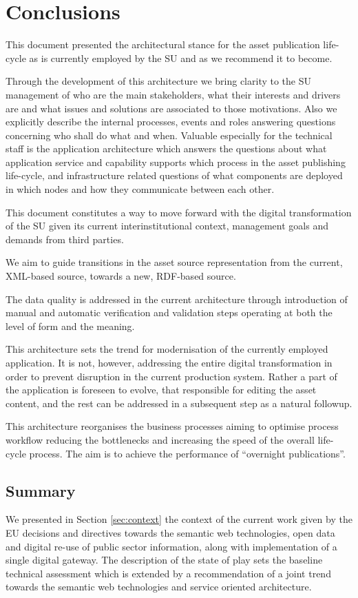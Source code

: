 \section{Conclusions}
\label{sec:conclusions}
	
	This document presented the architectural stance for the asset publication life-cycle as is currently employed by the SU and as we recommend it to become.
	
	Through the development of this architecture we bring clarity to the SU management of who are the main stakeholders, what their interests and drivers are and what issues and solutions are associated to those motivations. Also we explicitly describe the internal processes, events and roles answering questions concerning who shall do what and when. Valuable especially for the technical staff is the application architecture which answers the questions about what application service and capability supports which process in the asset publishing life-cycle, and infrastructure related questions of what components are deployed in which nodes and how they communicate between each other. 
	
	This document constitutes a way to move forward with the digital transformation of the SU given its current interinstitutional context, management goals and demands from third parties.
	
	We aim to guide transitions in the asset source representation from the current, XML-based source, towards a new, RDF-based source. 
	
    The data quality is addressed in the current architecture through introduction of manual and automatic verification and validation steps operating at both the level of form and the meaning.
    
    This architecture sets the trend for modernisation of the currently employed application. It is not, however, addressing the entire digital transformation in order to prevent disruption in the current production system. Rather a part of the application is foreseen to evolve, that responsible for editing the asset content, and the rest can be addressed in a subsequent step as a natural followup.
	
	This architecture reorganises the business processes aiming to optimise process workflow reducing the bottlenecks and increasing the speed of the overall life-cycle process. The aim is to achieve the performance of ``overnight publications''. 

	\subsection{Summary}
	We presented in Section \ref{sec:context} the context of the current work given by the EU decisions and directives towards the semantic web technologies, open data and digital re-use of public sector information, along with implementation of a single digital gateway. The description of the state of play sets the baseline technical assessment which is extended by a recommendation of a joint trend towards the semantic web technologies and service oriented architecture.
	
